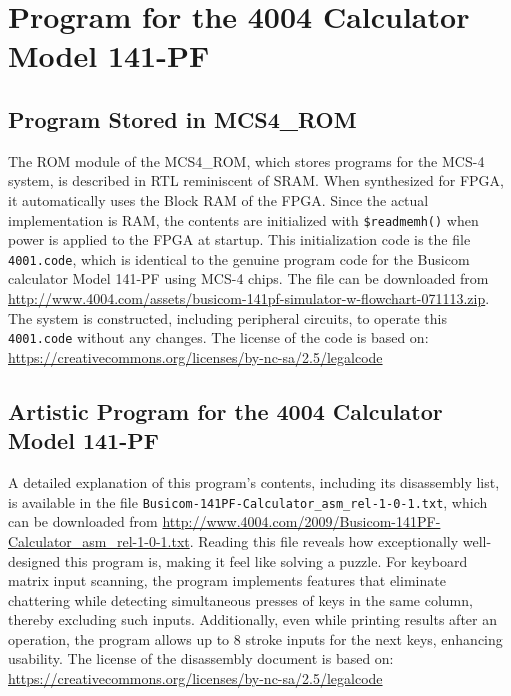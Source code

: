 \section{Program for the 4004 Calculator Model 141-PF}
\subsection{Program Stored in MCS4\_ROM}
The ROM module of the MCS4\_ROM, which stores programs for the MCS-4 system, is described in RTL reminiscent of SRAM. When synthesized for FPGA, it automatically uses the Block RAM of the FPGA. Since the actual implementation is RAM, the contents are initialized with \verb|$readmemh()| when power is applied to the FPGA at startup. This initialization code is the file \texttt{4001.code}, which is identical to the genuine program code for the Busicom calculator Model 141-PF using MCS-4 chips. The file can be downloaded from \url{http://www.4004.com/assets/busicom-141pf-simulator-w-flowchart-071113.zip}. The system is constructed, including peripheral circuits, to operate this \texttt{4001.code} without any changes.
The license of the code is based on: \\
\url{https://creativecommons.org/licenses/by-nc-sa/2.5/legalcode}

\subsection{Artistic Program for the 4004 Calculator Model 141-PF}
A detailed explanation of this program's contents, including its disassembly list, is available in the file \texttt{Busicom-141PF-Calculator\_asm\_rel-1-0-1.txt}, which can be downloaded from \url{http://www.4004.com/2009/Busicom-141PF-Calculator_asm_rel-1-0-1.txt}. Reading this file reveals how exceptionally well-designed this program is, making it feel like solving a puzzle. For keyboard matrix input scanning, the program implements features that eliminate chattering while detecting simultaneous presses of keys in the same column, thereby excluding such inputs. Additionally, even while printing results after an operation, the program allows up to 8 stroke inputs for the next keys, enhancing usability.
The license of the disassembly document is based on: \\
\url{https://creativecommons.org/licenses/by-nc-sa/2.5/legalcode}

